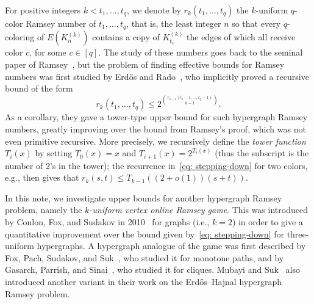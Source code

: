 \documentclass[A4paper,reqno,oneside,12pt]{amsart}
\theoremstyle{plain}
\theoremstyle{definition}
\begin{document}
For positive integers $k< t_1, \dots, t_q$, we denote by $r_k(t_1, \dots, t_q)$ the $k$-uniform $q$-color Ramsey number of $t_1, \dots, t_q$, that is, the least integer $n$ so that every $q$-coloring of $E(K_n^{(k)})$ contains a copy of $K_{t_c}^{(k)}$ the edges of which all receive color $c$, for some $c \in [q]$.
The study of these numbers goes back to the seminal paper of Ramsey~\cite{Ramsey}, but the problem of finding effective bounds for Ramsey numbers was first studied by Erd\H{o}s and Rado~\cite{ER52}, who 
implicitly proved a recursive bound of the form
\begin{equation}
\label{eq: stepping-down}
    r_k(t_1,\ldots,t_q) \leq 2^{\binom{r_{k-1}(t_1-1,\ldots,t_q-1)}{k-1}}.
\end{equation}
As a corollary, they gave a tower-type upper bound for such hypergraph Ramsey numbers,
greatly improving over the bound from Ramsey's proof, which was not even primitive recursive.
More precisely, we recursively define the {\it tower function} $T_i(x)$ by setting $T_0(x) = x$ and $T_{i+1}(x) = 2^{T_i(x)}$ (thus the subscript is the number of 2's in the tower); the recurrence in~\eqref{eq: stepping-down} for two colors, e.g., then gives that $r_k(s,t) \leq T_{k-1}((2+o(1))(s+t))$.

In this note, we investigate upper bounds for another hypergraph Ramsey problem, namely the {\it $k$-uniform vertex online Ramsey game}.
This was introduced by Conlon, Fox, and Sudakov in 2010~\cite{CFS10} for graphs (i.e., $k=2$) in order to give a quantitative improvement over the bound given by~\eqref{eq: stepping-down} for three-uniform hypergraphs.
A hypergraph analogue of the game was first described by Fox, Pach, Sudakov, and Suk~\cite{FPSS12}, who studied it for monotone paths,
and by Gasarch, Parrish, and Sinai~\cite{GPS}, who studied it for cliques.
Mubayi and Suk~\cite{MS20} also introduced another variant in their work on the Erd\H{o}s--Hajnal hypergraph Ramsey problem.
\end{document}
